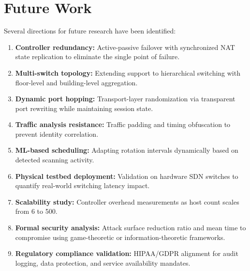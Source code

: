 \documentclass[conference]{IEEEtran}
\begin{document}
\section{Future Work}

Several directions for future research have been identified:

\begin{enumerate}
    \item \textbf{Controller redundancy:} Active-passive failover with synchronized NAT state replication to eliminate the single point of failure.
    \item \textbf{Multi-switch topology:} Extending support to hierarchical switching with floor-level and building-level aggregation.
    \item \textbf{Dynamic port hopping:} Transport-layer randomization via transparent port rewriting while maintaining session state.
    \item \textbf{Traffic analysis resistance:} Traffic padding and timing obfuscation to prevent identity correlation.
    \item \textbf{ML-based scheduling:} Adapting rotation intervals dynamically based on detected scanning activity.
    \item \textbf{Physical testbed deployment:} Validation on hardware SDN switches to quantify real-world switching latency impact.
    \item \textbf{Scalability study:} Controller overhead measurements as host count scales from 6 to 500.
    \item \textbf{Formal security analysis:} Attack surface reduction ratio and mean time to compromise using game-theoretic or information-theoretic frameworks.
    \item \textbf{Regulatory compliance validation:} HIPAA/GDPR alignment for audit logging, data protection, and service availability mandates.
\end{enumerate}


\end{document}
